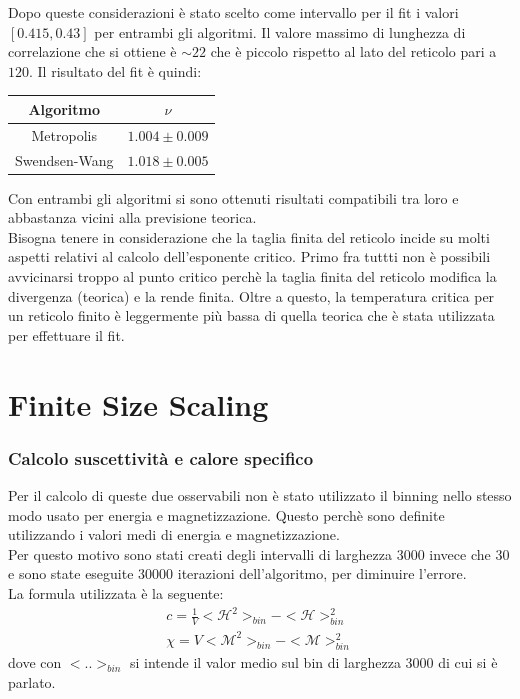 Dopo queste considerazioni è stato scelto come intervallo per il fit i valori $[0.415,0.43]$ per entrambi gli algoritmi. Il valore massimo di lunghezza di correlazione che si ottiene è $\sim 22$ che è piccolo rispetto al lato del reticolo pari a $120$. 
Il risultato del fit è quindi:
\begin{center}
	\begin{tabular}{cc}
	\toprule
	Algoritmo & $\nu$ \\
	\midrule
	Metropolis & $ 1.004 \pm 0.009 $\\
	Swendsen-Wang	& $ 1.018 \pm 0.005 $\\
	\bottomrule
	\end{tabular}
\end{center}

Con entrambi gli algoritmi si sono ottenuti risultati compatibili tra loro e abbastanza vicini alla previsione teorica.\\
Bisogna tenere in considerazione che la taglia finita del reticolo incide su molti aspetti relativi al calcolo dell'esponente critico. Primo fra tuttti non è possibili avvicinarsi troppo al punto critico perchè la taglia finita del reticolo modifica la divergenza (teorica) e la rende finita. Oltre a questo, la temperatura critica per un reticolo finito è leggermente più bassa di quella teorica che è stata utilizzata per effettuare il fit. 
\newpage
\section{Finite Size Scaling}
\subsubsection*{Calcolo suscettività e calore specifico}
Per il calcolo di queste due osservabili non è stato utilizzato il binning nello stesso modo usato per energia e magnetizzazione. Questo perchè sono definite utilizzando i valori medi di energia e magnetizzazione.\\
Per questo motivo sono stati creati degli intervalli di larghezza 3000 invece che 30 e sono state eseguite 30000 iterazioni dell'algoritmo, per diminuire l'errore.\\
La formula utilizzata è la seguente:
\begin{align*}
	c = \frac{1}{V} < \mathcal{H}^2>_{bin} - <\mathcal{H}>_{bin}^2 \\
	\chi = V < \mathcal{M}^2>_{bin} - <\mathcal{M}>_{bin}^2
\end{align*}
dove con $< ..>_{bin}$ si intende il valor medio sul bin di larghezza 3000 di cui si è parlato.

